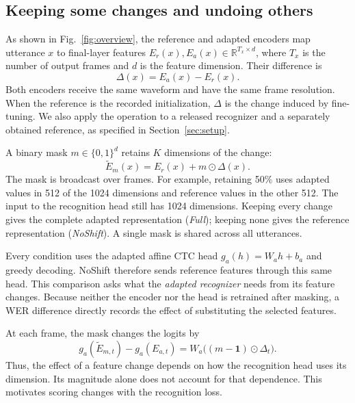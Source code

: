 \documentclass{article}
\begin{document}
\subsection{Keeping some changes and undoing others}
As shown in Fig.~\ref{fig:overview}, the reference and adapted encoders map utterance $x$ to final-layer features $E_r(x),E_a(x)\in\mathbb{R}^{T_x\times d}$, where $T_x$ is the number of output frames and $d$ is the feature dimension. Their difference is
\begin{equation}
 \Delta(x)=E_a(x)-E_r(x).
 \label{eq:shift}
\end{equation}
Both encoders receive the same waveform and have the same frame resolution. When the reference is the recorded initialization, $\Delta$ is the change induced by fine-tuning. We also apply the operation to a released recognizer and a separately obtained reference, as specified in Section~\ref{sec:setup}.

A binary mask $m\in\{0,1\}^{d}$ retains $K$ dimensions of the change:
\begin{equation}
 \widetilde E_m(x)=E_r(x)+m\odot\Delta(x).
 \label{eq:mask}
\end{equation}
The mask is broadcast over frames. For example, retaining 50\% uses adapted values in 512 of the 1024 dimensions and reference values in the other 512. The input to the recognition head still has 1024 dimensions. Keeping every change gives the complete adapted representation (\emph{Full}); keeping none gives the reference representation (\emph{NoShift}). A single mask is shared across all utterances.

Every condition uses the adapted affine CTC head $g_a(h)=W_ah+b_a$ and greedy decoding. NoShift therefore sends reference features through this same head. This comparison asks what the \emph{adapted recognizer} needs from its feature changes. Because neither the encoder nor the head is retrained after masking, a WER difference directly records the effect of substituting the selected features.

At each frame, the mask changes the logits by
\begin{equation}
 g_a(\widetilde E_{m,t})-g_a(E_{a,t})
 =W_a\bigl((m-\mathbf{1})\odot\Delta_t\bigr).
 \label{eq:logits}
\end{equation}
Thus, the effect of a feature change depends on how the recognition head uses its dimension. Its magnitude alone does not account for that dependence. This motivates scoring changes with the recognition loss.
\end{document}
